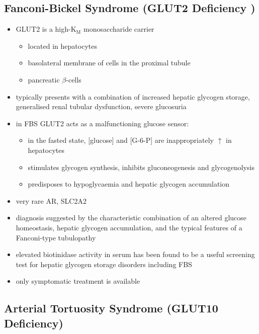 \documentclass{scrartcl}
\begin{document}
\subsection{Fanconi-Bickel Syndrome (GLUT2 Deficiency )}
\label{sec:org381ad85}

\begin{itemize}
\item GLUT2 is a high-K\(_{\text{M}}\) monosaccharide carrier 
\begin{itemize}
\item located in hepatocytes
\item basolateral membrane of cells in the proximal tubule
\item pancreatic \(\beta\)-cells
\end{itemize}

\item typically presents with a combination of increased hepatic
glycogen storage, generalised renal tubular dysfunction, severe glucosuria

\item in FBS GLUT2 acts as a malfunctioning glucose sensor:
\begin{itemize}
\item in the fasted state, [glucose] and [G-6-P] are inappropriately \(\uparrow\) in hepatocytes
\item stimulates glycogen synthesis, inhibits gluconeogenesis and glycogenolysis
\item predisposes to hypoglycaemia and hepatic glycogen accumulation
\end{itemize}

\item very rare AR, SLC2A2

\item diagnosis suggested by the characteristic combination of an altered
glucose homeostasis, hepatic glycogen accumulation, and the typical
features of a Fanconi-type tubulopathy

\item elevated biotinidase activity in serum has been found to be a useful
screening test for hepatic glycogen storage disorders including FBS

\item only symptomatic treatment is available
\end{itemize}

\subsection{Arterial Tortuosity Syndrome (GLUT10 Deficiency)}
\label{sec:org7457147}
\end{document}

